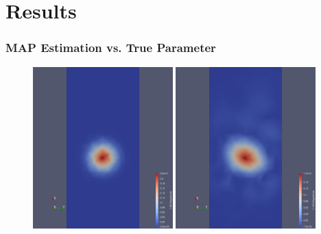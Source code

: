 \documentclass[
  pdf,
  10pt,
  xcolor={svgnames},
]{beamer}
\begin{document}
\section{Results}
\begin{frame}
  \frametitle{MAP Estimation vs. True Parameter}
  \begin{figure}
    \centering
    \includegraphics[width=0.48\textwidth]{./resources/m_true}
    \includegraphics[width=0.48\textwidth]{./resources/map_m}
  \end{figure}
\end{frame}
\end{document}
